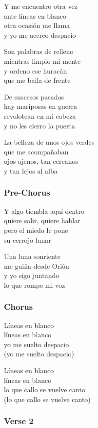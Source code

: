 \documentclass[]{article}
\begin{document}
Y me encuentro otra vez\\
ante líneas en blanco\\
otra ocasión me llama\\
y yo me acerco despacio

Son palabras de relleno\\
mientras limpio mi mente\\
y ordeno ese huracán\\
que me baila de frente

De suscesos pasados\\
hay mariposas en guerra\\
revolotean en mi cabeza\\
y no les cierro la puerta

La belleza de unos ojos verdes\\
que me acompañaban\\
ojos ajenos, tan cercanos\\
y tan lejos al alba

\subsubsection{Pre-Chorus}\label{pre-chorus-24}

Y algo tiembla aquí dentro\\
quiere salir, quiere hablar\\
pero el miedo le pone\\
su cerrojo lunar

Una luna sonriente\\
me guiña desde Orión\\
y yo sigo juntando\\
lo que rompe mi voz

\subsubsection{Chorus}\label{chorus-40}

Líneas en blanco\\
líneas en blanco\\
yo me suelto despacio\\
(yo me suelto despacio)

Líneas en blanco\\
líneas en blanco\\
lo que callo se vuelve canto\\
(lo que callo se vuelve canto)

\subsubsection{Verse 2}\label{verse-2-12}
\end{document}
